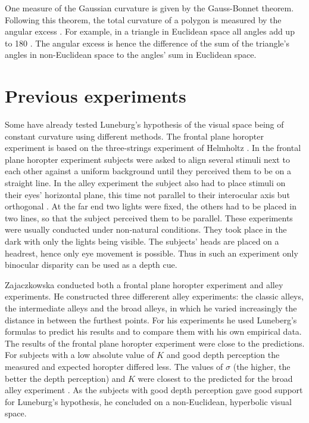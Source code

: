 One measure of the Gaussian curvature is given by the Gauss-Bonnet theorem.
Following this theorem, the total curvature of a polygon is measured by the angular excess \cite{wilson.2007}. For example, in a triangle in Euclidean space all angles add up to 180\textdegree{} \cite{Parrochia.2018}. 
The angular excess is hence the difference of the sum of the triangle's angles in non-Euclidean space to the angles' sum in Euclidean space. 
\section{Previous experiments}
Some have already tested Luneburg's hypothesis of the visual space being of constant curvature using different methods. The frontal plane horopter ex\-pe\-ri\-ment is based on the three-strings ex\-pe\-ri\-ment of Helmholtz \cite{Helmholtz.1867}. In the frontal plane horopter experiment subjects were asked to align several stimuli next to each other against a uniform background until they perceived them to be on a straight line. %
In the alley experiment the subject also had to place stimuli on their eyes' horizontal plane, this time not parallel to their interocular axis but orthogonal \cite{Blumenfeld.1913}. At the far end two lights were fixed, the others had to be placed in two lines, so that the subject perceived them to be parallel. These experiments were usually conducted under non-natural conditions. They took place in the dark with only the lights being visible. The subjects' heads are placed on a headrest, hence only eye movement is possible. Thus in such an experiment only binocular disparity can be used as a depth cue. 

Zajaczkowska \citeyear{Zajackowska1956.} conducted both a frontal plane horopter experiment and alley experiments. He constructed three differerent alley experiments: the classic alleys, the intermediate alleys and the broad alleys, in which he varied increasingly the distance in between the furthest points. For his experiments he used Luneberg's formulas \cite{Luneburg.1950} to predict his results and to compare them with his own empirical data. The results of the frontal plane horopter experiment were close to the predictions. For subjects with a low absolute value of $K$ and good depth perception the measured and expected horopter differed less. The values of $\sigma$ (the higher, the better the depth perception) and $K$ were closest to the predicted for the broad alley experiment \cite{Zajackowska1956.}. %
As the subjects with good depth perception gave good support for Luneburg's hypothesis, he concluded on a non-Euclidean, hyperbolic visual space. 

